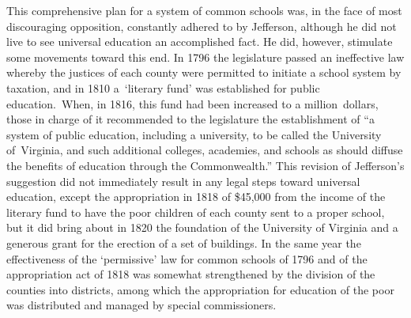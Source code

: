 \documentclass[
]{book}
\begin{document}
This comprehensive plan for a system of common schools was, in the face of most discouraging opposition, constantly adhered to by Jefferson, although he did not live to see universal education an accomplished fact. He did, however, stimulate some movements toward this end. In 1796 the legislature passed an ineffective law whereby the justices of each county were permitted to initiate a school system by taxation, and in 1810 a~`literary fund' was established for public education.~When, in 1816, this fund had been increased to a million~dollars, those in charge of it recommended to the legislature the establishment of ``a system of public education, including a university, to be called the University of~Virginia, and such additional colleges, academies, and schools as should diffuse the benefits of education through the Commonwealth.'' This revision of Jefferson's suggestion did not immediately result in any legal steps toward universal education, except the appropriation in 1818 of \$45,000 from the income of the literary fund to have the poor children of each county sent to a proper school, but it did bring about in 1820 the foundation of the University of Virginia and a generous grant for the erection of a set of buildings. In the same year the effectiveness of the `permissive' law for common schools of 1796 and of the appropriation act of 1818 was somewhat strengthened by the division of the counties into districts, among which the appropriation for education of the poor was distributed and managed by special commissioners.
\end{document}
